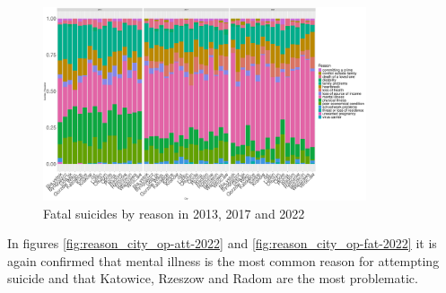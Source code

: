 \documentclass{article}
\begin{document}
\begin{figure}[H]
    \centering
    \includegraphics[width=0.85\textwidth]{imgs/reason_city_fat_suicides-131722.pdf}
    \caption{Fatal suicides by reason  in 2013, 2017 and 2022}
    \label{fig:reason_city_fat_suicides-131722}
\end{figure}
In figures \ref{fig:reason_city_op-att-2022} and \ref{fig:reason_city_op-fat-2022}
it is again confirmed that mental illness is the most common reason for attempting
suicide and that Katowice, Rzeszow and Radom are the most problematic.
\end{document}
